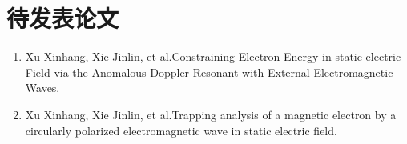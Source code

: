\begin{publications}
\begin{enumerate}
\end{enumerate}

\section*{待发表论文}

\begin{enumerate}
\item Xu Xinhang, Xie Jinlin, et al.Constraining Electron Energy in static electric Field via the Anomalous Doppler Resonant with External Electromagnetic Waves.
\item Xu Xinhang, Xie Jinlin, et al.Trapping analysis of a magnetic electron by a circularly polarized electromagnetic wave in static electric field.
\end{enumerate}


\end{publications}

